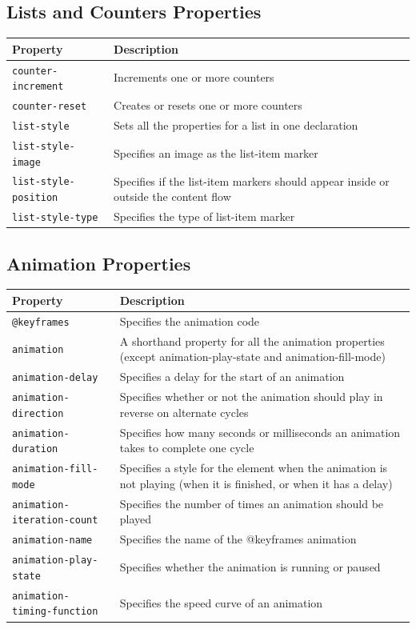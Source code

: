 \documentclass[11pt, letterpaper]{article}
\begin{document}
		\subsection{Lists and Counters Properties}
			\begin{longtable}{p{5cm} p{10cm}}
				\toprule
				Property & Description \\\midrule 
				\texttt{counter-increment} & Increments one or more counters \\\midrule
				\texttt{counter-reset} & Creates or resets one or more counters \\\midrule
				\texttt{list-style} & Sets all the properties for a list in one declaration \\\midrule
				\texttt{list-style-image} & Specifies an image as the list-item marker \\\midrule
				\texttt{list-style-position} & Specifies if the list-item markers should appear inside or outside the content flow \\\midrule
				\texttt{list-style-type} & Specifies the type of list-item marker \\\midrule
			\end{longtable}

		\subsection{Animation Properties}
			\begin{longtable}{p{5cm} p{10cm}}
				\toprule
				Property & Description \\\midrule 
				\texttt{@keyframes} & Specifies the animation code \\\midrule
				\texttt{animation} & A shorthand property for all the animation properties (except animation-play-state and animation-fill-mode) \\\midrule
				\texttt{animation-delay} & Specifies a delay for the start of an animation \\\midrule
				\texttt{animation-direction} & Specifies whether or not the animation should play in reverse on alternate cycles \\\midrule
				\texttt{animation-duration} & Specifies how many seconds or milliseconds an animation takes to complete one cycle \\\midrule
				\texttt{animation-fill-mode} & Specifies a style for the element when the animation is not playing (when it is finished, or when it has a delay) \\\midrule
				\texttt{animation-iteration-count} & Specifies the number of times an animation should be played \\\midrule
				\texttt{animation-name} & Specifies the name of the @keyframes animation \\\midrule
				\texttt{animation-play-state} & Specifies whether the animation is running or paused \\\midrule
				\texttt{animation-timing-function} & Specifies the speed curve of an animation \\\midrule
			\end{longtable}
\end{document}
